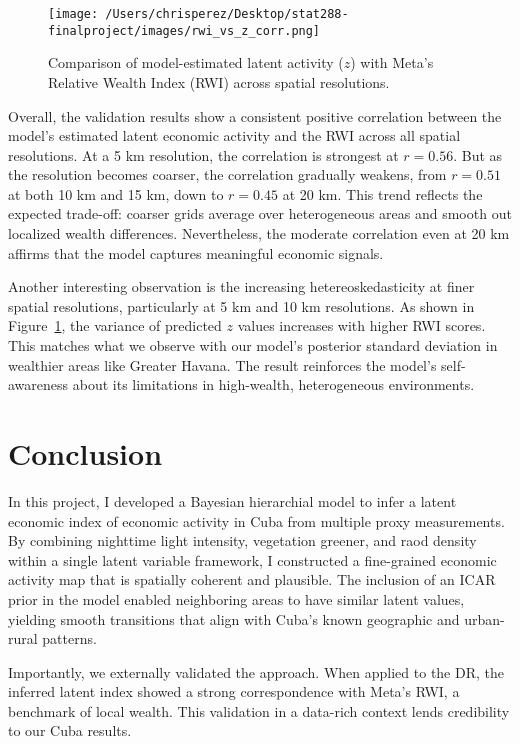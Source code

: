 \documentclass[12pt]{article}
\begin{document}
\begin{figure}[H]
  \centering
  \texttt{[image: /Users/chrisperez/Desktop/stat288-finalproject/images/rwi\_vs\_z\_corr.png]}
  \caption{Comparison of model-estimated latent activity ($z$) with Meta’s Relative Wealth Index (RWI) across spatial resolutions.}
  \label{fig:rwi_validation}
\end{figure}

Overall, the validation results show a consistent positive correlation between the model's estimated latent economic activity and the RWI across all spatial resolutions. At a 5 km resolution, the correlation is strongest at $r = 0.56$. But as the resolution becomes coarser, the correlation gradually weakens, from $r = 0.51$ at both 10 km and 15 km, down to $r = 0.45$ at 20 km. This trend reflects the expected trade-off: coarser grids average over heterogeneous areas and smooth out localized wealth differences. Nevertheless, the moderate correlation even at 20 km affirms that the model captures meaningful economic signals. 

Another interesting observation is the increasing hetereoskedasticity at finer spatial resolutions, particularly at 5 km and 10 km resolutions. As shown in Figure~\ref{fig:rwi_validation}, the variance of predicted $z$ values increases with higher RWI scores. This matches what we observe with our model's posterior standard deviation in wealthier areas like Greater Havana. The result reinforces the model's self-awareness about its limitations in high-wealth, heterogeneous environments.





\section{Conclusion}
\label{sec:discussion}

In this project, I developed a Bayesian hierarchial model to infer a latent economic index of economic activity in Cuba from multiple proxy measurements. By combining nighttime light intensity, vegetation greener, and raod density within a single latent variable framework, I constructed a fine-grained economic activity map that is spatially coherent and plausible. The inclusion of an ICAR prior in the model enabled neighboring areas to have similar latent values, yielding smooth transitions that align with Cuba's known geographic and urban-rural patterns. 

Importantly, we externally validated the approach. When applied to the DR, the inferred latent index showed a strong correspondence with Meta's RWI, a benchmark of local wealth. This validation in a data-rich context lends credibility to our Cuba results.
\end{document}
